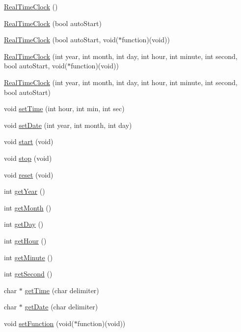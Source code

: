 \begin{DoxyCompactItemize}
\item 
\hyperlink{class_real_time_clock_ad4fb1eea4450089f13ae70650e5d2d1c}{RealTimeClock} ()
\item 
\hyperlink{group__group9_ga02c3e799d7541e2917ef46e71146ed90}{RealTimeClock} (bool autoStart)
\item 
\hyperlink{group__group9_ga81b623ff865ffad3a60defab000f84f5}{RealTimeClock} (bool autoStart, void($\ast$function)(void))
\item 
\hyperlink{group__group9_gadf73852d127f70e8cb37a83b206644e9}{RealTimeClock} (int year, int month, int day, int hour, int minute, int second, bool autoStart, void($\ast$function)(void))
\item 
\hyperlink{group__group9_gaad2bfb64a40a2a2729b569c08e7dcc49}{RealTimeClock} (int year, int month, int day, int hour, int minute, int second, bool autoStart)
\item 
void \hyperlink{group__group9_ga14ecce7648b24c7a85359af3f5b20af6}{setTime} (int hour, int min, int sec)
\item 
void \hyperlink{group__group9_ga4a5781efbfce128e0d3c461627ce371b}{setDate} (int year, int month, int day)
\item 
void \hyperlink{group__group9_gab62814ef94d0fe081e1f8a2756317a3c}{start} (void)
\item 
void \hyperlink{group__group9_ga116ebd0f42df71ef71d217527194d867}{stop} (void)
\item 
void \hyperlink{group__group9_ga81b09971229ddc88a7581bf5dcab7d1e}{reset} (void)
\item 
int \hyperlink{group__group9_ga58d426541706593b83016e0462e41625}{getYear} ()
\item 
int \hyperlink{group__group9_gaa8901871334c623b9473216de08c1432}{getMonth} ()
\item 
int \hyperlink{group__group9_ga29dbb224e31f5dca34c29e5e48ebeb2c}{getDay} ()
\item 
int \hyperlink{group__group9_ga86c10ef9f4da8dbee7fbd6236443fd53}{getHour} ()
\item 
int \hyperlink{group__group9_ga9784205a5ea194cca976af6cfee1308b}{getMinute} ()
\item 
int \hyperlink{group__group9_gaaddd01287cb8a6d2711b0650f7cbcc72}{getSecond} ()
\item 
char $\ast$ \hyperlink{group__group9_gaad4ca0e261b2a594e536303dee1116f4}{getTime} (char delimiter)
\item 
char $\ast$ \hyperlink{group__group9_gaa11261523ee392adf9081def9e3b1fcd}{getDate} (char delimiter)
\item 
void \hyperlink{group__group9_ga7b9d631751b1b21a8d22dd1599f7de43}{setFunction} (void($\ast$function)(void))
\end{DoxyCompactItemize}



